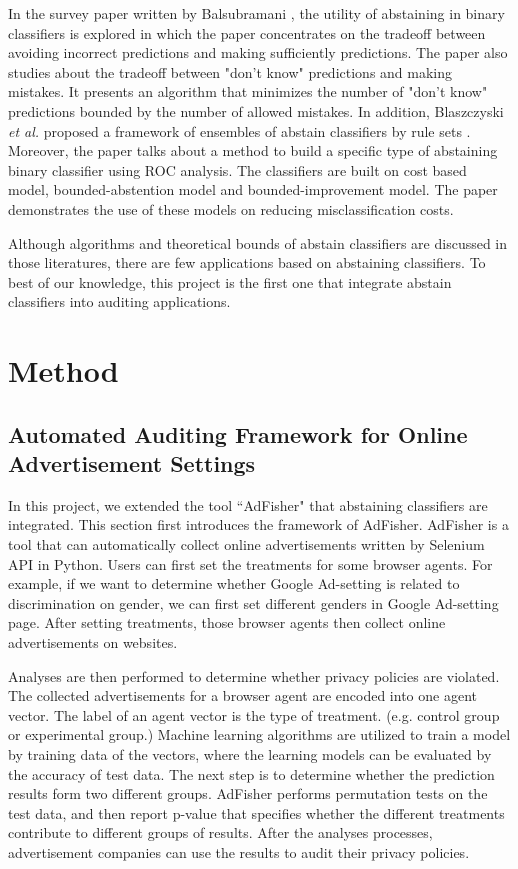 \documentclass[12pt, journal]{IEEEtran}
\begin{document}
In the survey paper written by Balsubramani \cite{akshay}, the utility of abstaining in binary classifiers is explored in which the paper concentrates on the tradeoff between avoiding incorrect predictions and making sufficiently predictions. 
The paper  \cite{sayedi2010trading} also studies about the tradeoff between "don't know" predictions and making mistakes. It presents an algorithm that minimizes the number of "don't know" predictions bounded by the number of allowed mistakes. 
In addition, Blaszczyski \textit{et al.} proposed a framework of ensembles of abstain classifiers by rule sets \cite{blaszczynski2009ensembles}. 
Moreover, the paper \cite{pietraszek2005optimizing} talks about a method to build a specific type of abstaining binary classifier using ROC analysis. The classifiers are built on cost based model, bounded-abstention model and bounded-improvement model. The paper demonstrates the use of these models on reducing misclassification costs.

Although algorithms and theoretical bounds of abstain classifiers are discussed in those literatures,  there are few applications based on abstaining classifiers.
To best of our knowledge, this project is the first one that integrate abstain classifiers into auditing applications.



\section{Method}
\subsection{Automated Auditing Framework for Online Advertisement Settings}
In this project, we extended the tool ``AdFisher" that abstaining classifiers are integrated. This section first introduces the framework of AdFisher.  
AdFisher is a tool that can automatically collect online advertisements written by Selenium API \cite{selenium} in Python.
Users can first set the treatments for some browser agents.
For example, if we want to determine whether Google Ad-setting is related to discrimination on gender, we can first set different genders in Google Ad-setting page.
After setting treatments, those browser agents then collect online advertisements on websites.

Analyses are then performed to determine whether privacy policies are violated.
The collected advertisements for a browser agent are encoded into one agent vector.
The label of an agent vector is the type of treatment. (e.g. control group or experimental group.)
Machine learning algorithms are utilized to train a model by training data of the vectors, where the learning models can be evaluated by the accuracy of test data.
The next step is to determine whether the prediction results form two different groups.
AdFisher performs permutation tests on the test data, and then report p-value that specifies whether the different treatments contribute to different groups of results.  
After the analyses processes, advertisement companies can use the results to audit their privacy policies.
\end{document}
